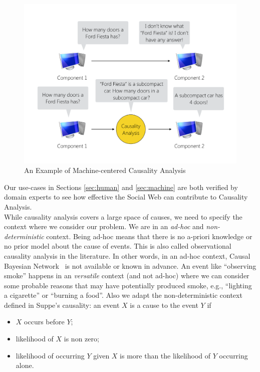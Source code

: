 \documentclass[conference]{IEEEtran}
\begin{document}
\begin{figure}[htpb]
\centerline{\includegraphics[width = 1\linewidth, keepaspectratio = true]{figs/machine.pdf}}
\caption{\label{fig:machine} An Example of Machine-centered Causality Analysis}
\end{figure}

Our use-cases in Sections \ref{sec:human} and \ref{sec:machine} are both verified by domain experts to see how effective the Social Web can contribute to Causality Analysis.\\

 While causality analysis covers a large space of causes, we need to specify the context where we consider our problem. We are in an {\em ad-hoc} and {\em non-deterministic} context. Being ad-hoc means that there is no a-priori knowledge or no prior model about the cause of events. This is also called observational causality analysis in the literature. In other words, in an ad-hoc context, Causal Bayesian Network~\cite{li2015practical} is not available or known in advance. An event like ``observing smoke'' happens in an {\em versatile} context (and not ad-hoc) where we can consider some probable reasons that may have potentially produced smoke, e.g., ``lighting a cigarette'' or ``burning a food''. Also we adapt the non-deterministic context defined in Suppe’s causality: an event $X$ is a cause to the event $Y$ if

\begin{itemize}
\item $X$ occurs before $Y$;
\item likelihood of $X$ is non zero;
\item likelihood of occurring $Y$ given $X$ is more than the likelihood of $Y$ occurring alone.
\end{itemize}
\end{document}
